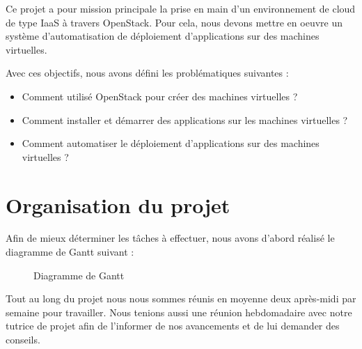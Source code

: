 \documentclass{report}
\begin{document}
        Ce projet a pour mission principale la prise en main d'un environnement de cloud de type IaaS à travers OpenStack. Pour cela, nous devons mettre en oeuvre un système d'automatisation de déploiement d'applications sur des machines virtuelles.\bigbreak
        
        Avec ces objectifs, nous avons défini les problématiques suivantes :
        \begin{itemize}
            \item Comment utilisé OpenStack pour créer des machines virtuelles ?
            \item Comment installer et démarrer des applications sur les machines virtuelles ?
            \item Comment automatiser le déploiement d'applications sur des machines virtuelles ?
        \end{itemize}
        \bigbreak

	\section{Organisation du projet}
	
    	Afin de mieux déterminer les tâches à effectuer, nous avons d'abord réalisé le diagramme de Gantt suivant :
    	
    	\begin{figure}[H]
            \caption{Diagramme de Gantt}
        \end{figure}
    
        Tout au long du projet nous nous sommes réunis en moyenne deux après-midi par semaine pour travailler.
        Nous tenions aussi une réunion hebdomadaire avec notre tutrice de projet afin de l'informer de nos avancements et de lui demander des conseils.
        \bigbreak
    
\end{document}
